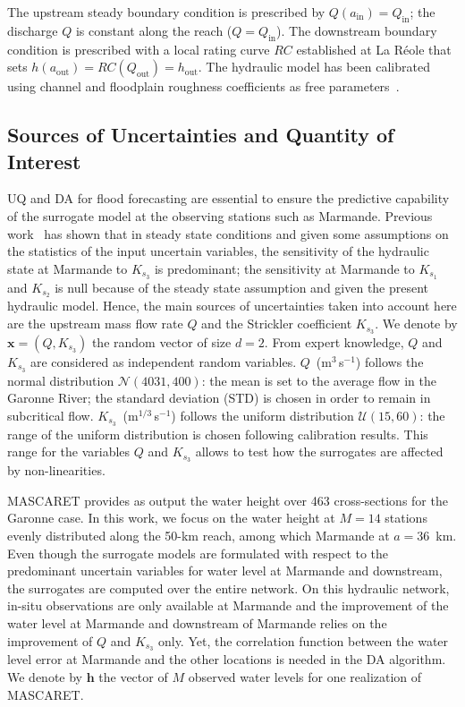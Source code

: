 The upstream steady boundary condition is prescribed by $Q(a_{\text{in}}) = Q_{\text{in}}$; the discharge $Q$ is constant along the reach ($Q = Q_{\text{in}}$). The downstream boundary condition is prescribed with a local rating curve $RC$ established at La R\'eole that sets $h(a_{\text{out}}) = RC(Q_{\text{out}}) = h_{\text{out}}$. The hydraulic model has been calibrated using channel and floodplain roughness coefficients as free parameters~\citep{besnard2011}. 

\subsection{Sources of Uncertainties and Quantity of Interest}\label{sec:database}

UQ and DA for flood forecasting are essential to ensure the predictive capability of the surrogate model at the observing stations such as Marmande. Previous work~\citep{elmocaydEMA} has shown that in steady state conditions and given some assumptions on the statistics of the input uncertain variables, the sensitivity of the hydraulic state at Marmande to $K_{s_3}$ is predominant; the sensitivity at Marmande to $K_{s_1}$ and $K_{s_2}$ is null because of the steady state assumption and given the present hydraulic model. Hence, the main sources of uncertainties taken into account here are the upstream mass flow rate $Q$ and the Strickler coefficient $K_{s_3}$. We denote by $\mathbf{x} = (Q, K_{s_3})$ the random vector of size $d = 2$. From expert knowledge, $Q$ and $K_{s_3}$ are considered as independent random variables. $Q$~(m$^3$\,s$^{-1}$) follows the normal distribution $\mathcal{N}(4031,400)$: the mean is set to the average flow in the Garonne River; the standard deviation (STD) is chosen in order to remain in subcritical flow. $K_{s_3}$~(m$^{1/3}$\,s$^{-1}$) follows the uniform distribution $\mathcal{U}(15,60)$: the range of the uniform distribution is chosen following calibration results. This range for the variables $Q$ and $K_{s_3}$ allows to test how the surrogates are affected by non-linearities. 

MASCARET provides as output the water height over 463 cross-sections for the Garonne case. In this work, we focus on the water height at $M = 14$ stations evenly distributed along the 50-km reach, among which Marmande at $a = 36$~km. Even though the surrogate models are formulated with respect to the predominant uncertain variables for water level at Marmande and downstream, the surrogates are computed over the entire network. On this hydraulic network, in-situ observations are only available at Marmande and the improvement of the water level at Marmande and downstream of Marmande
relies on the improvement of $Q$ and $K_{s_3}$ only. Yet, the correlation function between the water level error at Marmande and the other locations is needed in the DA algorithm. We denote by $\mathbf{h}$ the vector of $M$ observed water levels for one realization of MASCARET.

